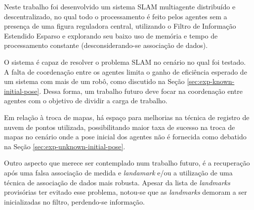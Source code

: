 Neste trabalho foi desenvolvido um sistema SLAM multiagente distribuído e 
descentralizado, no qual todo o processamento é feito pelos agentes sem a presença de uma figura reguladora central, utilizando o Filtro de Informação Estendido Esparso e explorando seu baixo uso de memória e tempo de processamento constante (desconsiderando-se associação de dados).

O sistema é capaz de resolver o problema SLAM no cenário no qual foi 
testado. A falta de 
coordenação entre os agentes limita o ganho de eficiência esperado de 
um sistema com mais de um robô, como discutido na Seção \ref{sec:exp-known-initial-pose}. Dessa forma, um trabalho futuro deve focar na coordenação entre agentes com o objetivo de dividir a carga de trabalho.

Em relação à troca de mapas, há espaço para melhorias na técnica de registro de nuvem de pontos utilizada, possibilitando maior taxa de sucesso na troca de mapas 
no cenário onde a pose inicial dos agentes não é fornecida como debatido na Seção \ref{sec:exp-unknown-initial-pose}.

Outro aspecto que merece ser contemplado num trabalho futuro, é a recuperação após uma falsa associação de medida e \textit{landamark} e/ou a 
utilização de uma técnica de associação de dados mais robusta. Apesar da 
lista de \textit{landmarks} provisórias ter evitado esse problema, notou-se que as \textit{landmarks} demoram a ser inicializadas no filtro, perdendo-se informação.